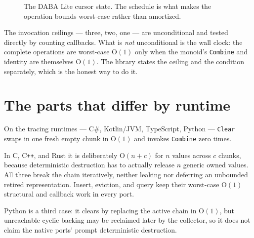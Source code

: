 \documentclass[11pt,twoside,openright]{book}
\newcommand{\code}[1]{\texorpdfstring{\textcolor{d7ink}{\texttt{#1}}}{#1}}
\newcommand{\bigoh}[1]{$\mathrm{O}(#1)$}
\begin{document}
\begin{figure}[htbp]
\centering
{}
\caption{The DABA Lite cursor state. The schedule is what makes the operation
bounds worst-case rather than amortized.}
\label{fig:daba}
\end{figure}

The invocation ceilings --- three, two, one --- are unconditional and tested
directly by counting callbacks. What is \emph{not} unconditional is the wall
clock: the complete operations are worst-case \bigoh{1} only when the monoid's
\code{Combine} and identity are themselves \bigoh{1}. The library states the
ceiling and the condition separately, which is the honest way to do it.

\section{The parts that differ by runtime}

\begin{caveatbox}[Clear is not \bigoh{1} everywhere]
On the tracing runtimes --- C\#, Kotlin/JVM, TypeScript, Python --- \code{Clear}
swaps in one fresh empty chunk in \bigoh{1} and invokes \code{Combine} zero
times.

In C, C\texttt{++}, and Rust it is deliberately \bigoh{n + c} for $n$ values
across $c$ chunks, because deterministic destruction has to actually release
$n$ generic owned values. All three break the chain iteratively, neither leaking
nor deferring an unbounded retired representation. Insert, eviction, and query
keep their worst-case \bigoh{1} structural and callback work in every port.

Python is a third case: it clears by replacing the active chain in \bigoh{1},
but unreachable cyclic backing may be reclaimed later by the collector, so it
does not claim the native ports' prompt deterministic destruction.
\end{caveatbox}
\end{document}
